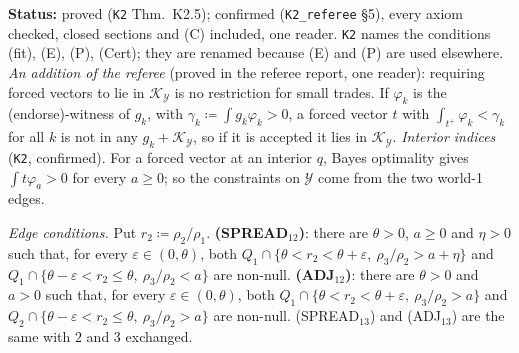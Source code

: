 \documentclass[11pt]{article}
\theoremstyle{definition}
\theoremstyle{remark}
\newcommand{\src}[1]{\texttt{#1}}
\newcommand{\status}[1]{\par\smallskip\noindent\textbf{Status:} #1\par\smallskip}
\begin{document}
\status{proved (\src{K2} Thm.~K2.5); confirmed (\src{K2\_referee} \S5), every axiom checked, closed sections and (C) included, one reader. \src{K2} names the conditions (fit), (E), (P), (Cert); they are renamed because (E) and (P) are used elsewhere. \emph{An addition of the referee} (proved in the referee report, one reader): requiring forced vectors to lie in $\mathcal K_{\mathcal Y}$ is no restriction for small trades. If $\varphi_k$ is the (endorse)-witness of $g_k$, with $\gamma_k\coloneqq\int g_k\varphi_k>0$, a forced vector $t$ with $\int_{t^+}\varphi_k<\gamma_k$ for all $k$ is not in any $g_k+\mathcal K_{\mathcal Y}$, so if it is accepted it lies in $\mathcal K_{\mathcal Y}$. \emph{Interior indices} (\src{K2}, confirmed). For a forced vector at an interior $q$, Bayes optimality gives $\int t\varphi_a>0$ for every $a\ge0$; so the constraints on $\mathcal Y$ come from the two world-1 edges.}

\emph{Edge conditions.} Put $r_2\coloneqq\rho_2/\rho_1$. \textbf{(SPREAD$_{12}$)}: there are $\theta>0$, $a\ge0$ and $\eta>0$ such that, for every $\varepsilon\in(0,\theta)$, both $Q_1\cap\{\theta<r_2<\theta+\varepsilon,\ \rho_3/\rho_2>a+\eta\}$ and $Q_1\cap\{\theta-\varepsilon<r_2\le\theta,\ \rho_3/\rho_2<a\}$ are non-null. \textbf{(ADJ$_{12}$)}: there are $\theta>0$ and $a>0$ such that, for every $\varepsilon\in(0,\theta)$, both $Q_1\cap\{\theta<r_2<\theta+\varepsilon,\ \rho_3/\rho_2>a\}$ and $Q_2\cap\{\theta-\varepsilon<r_2\le\theta,\ \rho_3/\rho_2>a\}$ are non-null. (SPREAD$_{13}$) and (ADJ$_{13}$) are the same with $2$ and $3$ exchanged.
\end{document}
